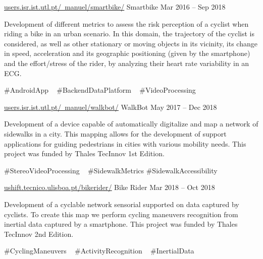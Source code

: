 

\begin{cventries}

  \cventry
	{\href{http://users.isr.ist.utl.pt/~manuel/smartbike/}{\underline{users.isr.ist.utl.pt/~manuel/smartbike/}}} %
	{Smartbike} %
	{Mar 2016 – Sep 2018} %
	{} %
	{
		\begin{cvitems} %
		Development of different metrics to assess the risk perception of a cyclist when riding a bike in an urban scenario. In this domain, the trajectory of the cyclist is considered, as well as other stationary or moving objects in its vicinity, its change in speed, acceleration and its geographic positioning (given by the smartphone) and the effort/stress of the rider, by analyzing their heart rate variability in an ECG.
		\end{cvitems}
	}
	{
		\#AndroidApp ~
		\#BackendDataPlatform ~
		\#VideoProcessing ~
	}

  \cventry
	{\href{http://users.isr.ist.utl.pt/~manuel/walkbot/}{\underline{users.isr.ist.utl.pt/~manuel/walkbot/}}} %
	{WalkBot} %
	{May 2017 – Dec 2018} %
	{} %
	{
		\begin{cvitems} %
			Development of a device capable of automatically digitalize and map a network of sidewalks in a city. This mapping allows for the  development of support applications for guiding pedestrians in cities with various mobility needs. This project was funded by Thales TecInnov 1st Edition.
		\end{cvitems}
	}
	{
		\#StereoVideoProcessing ~
		\#SidewalkMetrics
		\#SidewalkAccessibility
	}

\cventry
	{\href{ushift.tecnico.ulisboa.pt/bikerider/}{\underline{ushift.tecnico.ulisboa.pt/bikerider/}}} %
	{Bike Rider} %
	{Mar 2018 – Oct 2018} %
	{} %
	{
		\begin{cvitems} %
			Development of a cyclable network sensorial supported on data captured by cyclists. To create this map we perform cycling maneuvers recognition from inertial data captured by a smartphone.
			This project was funded by Thales TecInnov 2nd Edition.
		\end{cvitems}
	}
	{
		\#CyclingManeuvers ~
		\#ActivityRecognition ~
		\#InertialData
	}


\end{cventries}
